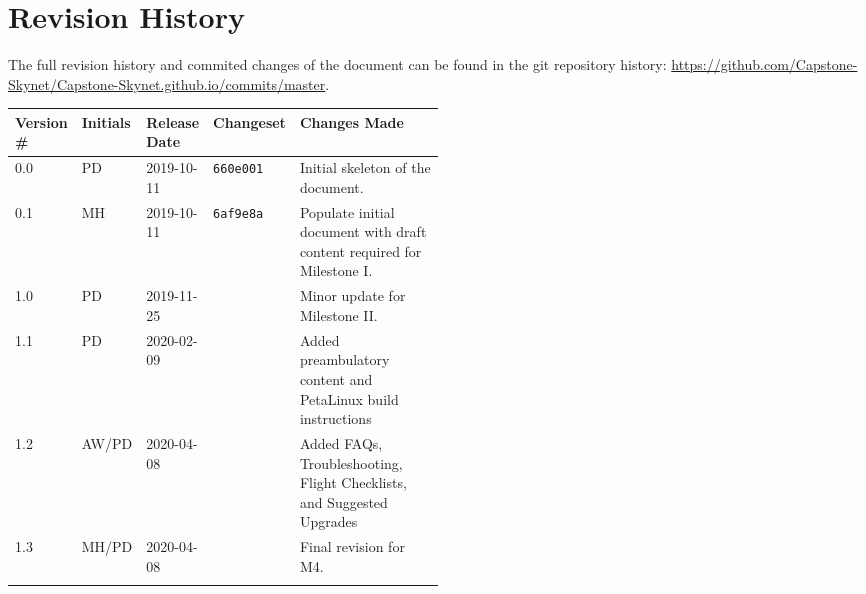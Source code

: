 \section*{Revision History}
The full revision history and commited changes of the document can be found in the git repository history: \href{https://github.com/Capstone-Skynet/Capstone-Skynet.github.io}{https://github.com/Capstone-Skynet/Capstone-Skynet.github.io/commits/master}.

\begin{table}[H]
\begin{tabular}{*{4}{l}p{0.5\linewidth}}
\hline
Version \# & Initials & Release Date & Changeset & Changes Made \\ \hline

0.0 & PD & 2019-10-11 & \texttt{660e001} & Initial skeleton of the document.\\
0.1 & MH & 2019-10-11 & \texttt{6af9e8a} & Populate initial document with draft content required for Milestone I.\\
1.0 & PD & 2019-11-25 &  & Minor update for Milestone II.\\
1.1 & PD & 2020-02-09 &  & Added preambulatory content and PetaLinux build instructions \\
1.2 & AW/PD & 2020-04-08 &  & Added FAQs, Troubleshooting, Flight Checklists, and Suggested Upgrades \\
1.3 & MH/PD & 2020-04-08 & \texttt{} & Final revision for M4.\\

 & & & \\ \hline
\end{tabular}
\end{table}